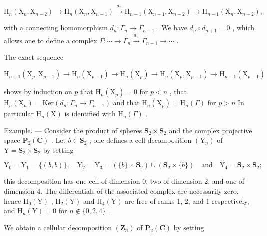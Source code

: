 \[
\mathrm{H} _ {n} \left(\mathrm{X} _ {n}, \mathrm{X} _ {n - 2}\right) \longrightarrow \mathrm{H} _ {n} \left(\mathrm{X} _ {n}, \mathrm{X} _ {n - 1}\right) \xrightarrow {d _ {n}} \mathrm{H} _ {n - 1} \left(\mathrm{X} _ {n - 1}, \mathrm{X} _ {n - 2}\right) \longrightarrow \mathrm{H} _ {n - 1} \left(\mathrm{X} _ {n}, \mathrm{X} _ {n - 2}\right),
\]

with a connecting homomorphism \(d_{n}:\Gamma_{n}\to\Gamma_{n-1}\) . We have \(d_{n}\circ d_{n+1}=0\) , which allows one to define a complex \(\Gamma:\cdots\to\Gamma_{n}\xrightarrow{d_{n}}\Gamma_{n-1}\to\cdots\) .

The exact sequence

\[
\mathrm{H} _ {n + 1} \left(\mathrm{X} _ {p}, \mathrm{X} _ {p - 1}\right)\rightarrow \mathrm{H} _ {n} \left(\mathrm{X} _ {p - 1}\right)\rightarrow \mathrm{H} _ {n} \left(\mathrm{X} _ {p}\right)\rightarrow \mathrm{H} _ {n} \left(\mathrm{X} _ {p}, \mathrm{X} _ {p - 1}\right)\rightarrow \mathrm{H} _ {n - 1} \left(\mathrm{X} _ {p - 1}\right)
\]

shows by induction on \(p\) that \(\mathrm{H}_{n}(\mathrm{X}_{p})=0\) for \(p<n\) , that \(\mathrm{H}_{n}(\mathrm{X}_{n})=\mathrm{Ker}\left(d_{n}:\Gamma_{n}\to\Gamma_{n-1}\right)\) and that \(\mathrm{H}_{n}(\mathrm{X}_{p})=\mathrm{H}_{n}(\Gamma)\) for \(p>n\) In particular \(\mathrm{H}_{n}(\mathrm{X})\) is identified with \(\mathrm{H}_{n}(\Gamma)\) .

Example. --- Consider the product of spheres \(\mathbf{S}_{2} \times \mathbf{S}_{2}\) and the complex projective space \(\mathbf{P}_{2}(\mathbf{C})\) . Let \(b \in \mathbf{S}_{2}\) ; one defines a cell decomposition \((\mathrm{Y}_{n})\) of \(\mathrm{Y} = \mathbf{S}_{2} \times \mathbf{S}_{2}\) by setting

\[
\mathrm{Y} _ {0} = \mathrm{Y} _ {1} = \{(b, b) \}, \quad \mathrm{Y} _ {2} = \mathrm{Y} _ {3} = (\{b \} \times \mathbf {S} _ {2}) \cup (\mathbf {S} _ {2} \times \{b \}) \quad \text {and} \quad \mathrm{Y} _ {4} = \mathbf {S} _ {2} \times \mathbf {S} _ {2};
\]

this decomposition has one cell of dimension 0, two of dimension 2, and one of dimension 4. The differentials of the associated complex are necessarily zero, hence \(\mathrm{H}_{0}(\mathrm{Y})\) , \(\mathrm{H}_{2}(\mathrm{Y})\) and \(\mathrm{H}_{4}(\mathrm{Y})\) are free of ranks 1, 2, and 1 respectively, and \(\mathrm{H}_{n}(\mathrm{Y}) = 0\) for \(n \notin \{0, 2, 4\}\) .

We obtain a cellular decomposition \((\mathbf{Z}_{n})\) of \(\mathbf{P}_{2}(\mathbf{C})\) by setting

